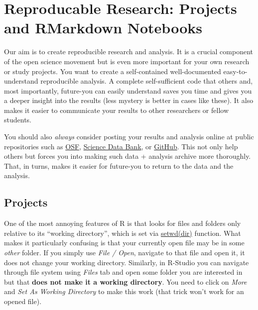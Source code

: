 \documentclass[
]{book}
\begin{document}
\hypertarget{reproducable-research}{%
\chapter{Reproducable Research: Projects and RMarkdown Notebooks}\label{reproducable-research}}

Our aim is to create reproducible research and analysis. It is a crucial component of the open science movement but is even more important for your own research or study projects. You want to create a self-contained well-documented easy-to-understand reproducible analysis. A complete self-sufficient code that others and, most importantly, future-you can easily understand saves you time and gives you a deeper insight into the results (less mystery is better in cases like these). It also makes it easier to communicate your results to other researchers or fellow students.

You should also \emph{always} consider posting your results and analysis online at public repositories such as \href{https://osf.io/}{OSF}, \href{https://www.scidb.cn/en}{Science Data Bank}, or \href{https://github.com/}{GitHub}. This not only help others but forces you into making such data + analysis archive more thoroughly. That, in turns, makes it easier for future-you to return to the data and the analysis.

\hypertarget{projects}{%
\section{Projects}\label{projects}}

One of the most annoying features of R is that looks for files and folders only relative to its ``working directory'', which is set via \href{https://www.rdocumentation.org/packages/base/versions/3.6.2/topics/getwd}{setwd(dir)} function. What makes it particularly confusing is that your currently open file may be in some \emph{other} folder. If you simply use \emph{File / Open}, navigate to that file and open it, it does not change your working directory. Similarly, in R-Studio you can navigate through file system using \emph{Files} tab and open some folder you are interested in but that \textbf{does not make it a working directory}. You need to click on \emph{More} and \emph{Set As Working Directory} to make this work (that trick won't work for an opened file).
\end{document}
